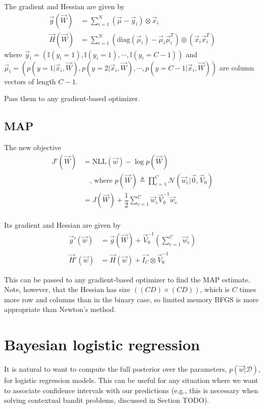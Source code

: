 The gradient and Hessian are given by
\begin{align}
\vec{g}(\vec{W}) & =\sum\limits_{i=1}^N (\vec{\mu}-\vec{y}_i) \otimes \vec{x}_i \\
\vec{H}(\vec{W}) & =\sum\limits_{i=1}^N (\mathrm{diag}(\vec{\mu}_i)-\vec{\mu}_i\vec{\mu}_i^T) \otimes (\vec{x}_i\vec{x}_i^T)
\end{align}
where $\vec{y}_i=(\mathbb{I}(y_i=1),\mathbb{I}(y_i=1),\cdots, \mathbb{I}(y_i=C-1))$ and $\vec{\mu}_i=(p(y=1|\vec{x}_i,\vec{W}),p(y=2|\vec{x}_i,\vec{W}),\cdots, p(y=C-1|\vec{x}_i,\vec{W}))$ are column vectors of length $C-1$.

Pass them to any gradient-based optimizer.


\subsection{MAP}
The new objective
\begin{align}
J'(\vec{W}) & =\mathrm{NLL}(\vec{w})-\log{p(\vec{W})} \\
            & \quad \text{, where } p(\vec{W}) \triangleq \prod\limits_{c=1}^C \mathcal{N}(\vec{w}_c|\vec{0},\vec{V}_0) \nonumber \\
   & = J(\vec{W})+\dfrac{1}{2}\sum\limits_{c=1}^C \vec{w}_c\vec{V}_0^{-1}\vec{w}_c \\
\end{align}

Its gradient and Hessian are given by
\begin{align}
\vec{g}'(\vec{w}) & =\vec{g}(\vec{W})+\vec{V}_0^{-1}\left(\sum\limits_{c=1}^C \vec{w}_c\right) \\
\vec{H}'(\vec{w}) & =\vec{H}(\vec{w})+\vec{I_C} \otimes \vec{V}_0^{-1}
\end{align}

This can be passed to any gradient-based optimizer to find the MAP estimate. Note, however, that the Hessian has size $((CD)×(CD))$, which is $C$ times more row and columns than in the binary case, so limited memory BFGS is more appropriate than Newton’s method.


\section{Bayesian logistic regression}
It is natural to want to compute the full posterior over the parameters, $p(\vec{w}|\mathcal{D})$, for logistic regression models. This can be useful for any situation where we want to associate confidence intervals with our predictions (e.g., this is necessary when solving contextual bandit problems, discussed in Section TODO).


